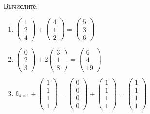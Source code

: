 \documentclass[11pt, a4paper]{extarticle}
\begin{document}
\subsection{}
Вычислите:
\begin{multicols}{2}
		\begin{enumerate}[label=\alph*)]
		\item $\begin{pmatrix}
		1 \\ 2 \\ 4
		\end{pmatrix} + \begin{pmatrix}
		4 \\ 1 \\ 2
		\end{pmatrix} = \begin{pmatrix}
		5 \\ 3 \\ 6
		\end{pmatrix}$
		
		\item $\begin{pmatrix}
		0 \\ 2 \\ 3
		\end{pmatrix} + 2\begin{pmatrix}
		3 \\ 1 \\ 8
		\end{pmatrix} = \begin{pmatrix}
		6 \\ 4 \\ 19
		\end{pmatrix}$
		
		\item $ 0_{4 \times 1} + \begin{pmatrix}
		1 \\ 1  \\ 1 \\ 1
		\end{pmatrix} = \begin{pmatrix}
		0 \\ 0  \\ 0 \\ 0
		\end{pmatrix} + \begin{pmatrix}
		1 \\ 1  \\ 1 \\ 1
		\end{pmatrix} = \begin{pmatrix}
		1 \\ 1  \\ 1 \\ 1
		\end{pmatrix}$
		

\end{enumerate}
\end{multicols}
\end{document}
